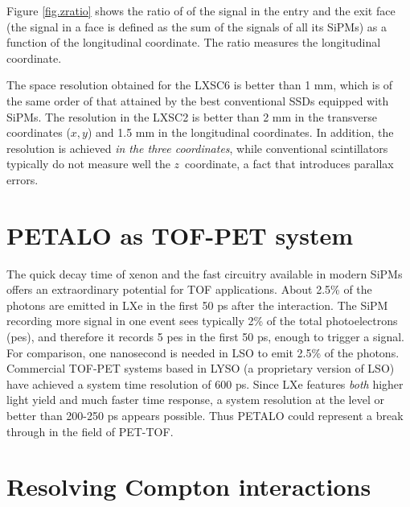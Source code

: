 \documentclass{JINST}
\begin{document}
Figure \ref{fig.zratio} shows the ratio of of the signal in the entry and the exit face (the signal in a face is defined as the sum of the signals of all its SiPMs) as a function of the longitudinal coordinate. The ratio measures the longitudinal coordinate.  

The space resolution obtained for the LXSC6 is better than 1 mm, which is of the same order of that attained by the best conventional SSDs equipped with SiPMs. The resolution in the LXSC2 is better than 2 mm in the transverse coordinates ($x,y$) and 1.5 mm in the longitudinal coordinates.  In addition, the resolution is achieved {\em in the three coordinates}, while conventional scintillators typically do not measure well the $z$~coordinate, a fact that introduces parallax errors. 


\section{PETALO as TOF-PET system}
\label{sec.tof}


The quick decay time of xenon and the fast circuitry available in modern SiPMs offers an extraordinary potential for TOF applications. About 2.5\% of the photons are emitted in LXe in the first 50 ps after the interaction. The SiPM recording more signal in one event sees typically  2\% of the total photoelectrons (pes), and therefore it records 5 pes in the first 50 ps, enough to trigger a signal. For comparison, one nanosecond is needed in LSO to emit 2.5\% of the photons. Commercial TOF-PET systems based in LYSO (a proprietary version of LSO) have achieved a system time resolution of 600 ps. Since LXe features {\em both} higher light yield and much faster time response, a system resolution at the level or better than 200-250 ps appears possible. Thus PETALO could represent a break through in the field of PET-TOF. 

\section{Resolving Compton interactions}
\label{sec.comp}
\end{document}
